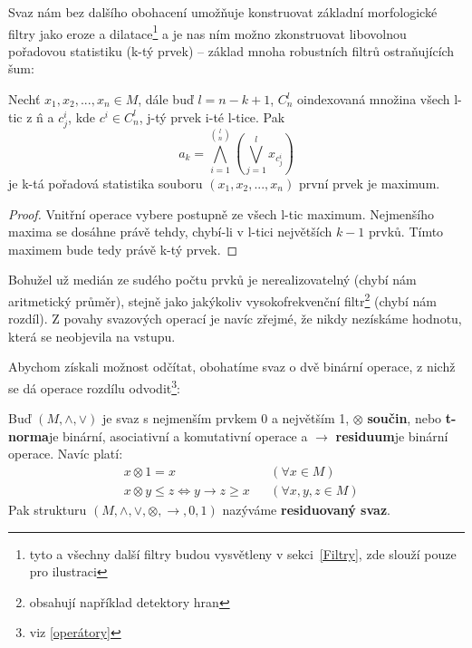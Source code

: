     Svaz nám bez dalšího obohacení umožňuje konstruovat základní morfologické filtry jako eroze a dilatace\footnote{tyto a všechny další filtry budou vysvětleny v sekci~\ref{Filtry}, zde slouží pouze pro ilustraci} a je nas ním možno zkonstruovat libovolnou pořadovou statistiku (k-tý prvek) -- základ mnoha robustních filtrů ostraňujících šum:

    \begin{theo}\label{k-tý prvek}
      Nechť $x_1,x_2,...,x_n \in M$, dále buď $l = n-k+1$, $C^{l}_n$ oindexovaná množina všech l-tic z \^n a $c^i_j$, kde $c^i \in C^{l}_n$, j-tý prvek i-té l-tice. Pak
      \[
        a_k = \bigwedge_{i = 1}^{{l}\choose{n}}\left( \bigvee_{j = 1}^{l} x_{c_{j}^i} \right)
      \]
      je k-tá pořadová statistika souboru $(x_1,x_2,...,x_n)$ \rl první prvek je maximum\rr.
    \end{theo}
    \begin{proof}
      Vnitřní operace vybere postupně ze všech l-tic maximum. Nejmenšího maxima se dosáhne právě tehdy, chybí-li v l-tici největších $k-1$ prvků. Tímto maximem bude tedy právě k-tý prvek. 
    \end{proof}
    
    Bohužel už medián ze sudého počtu prvků je nerealizovatelný (chybí nám aritmetický průměr), stejně jako jakýkoliv vysokofrekvenční filtr\footnote{obsahují například detektory hran} (chybí nám rozdíl). Z povahy svazových operací je navíc zřejmé, že nikdy nezískáme hodnotu, která se neobjevila na vstupu.
    
    Abychom získali možnost odčítat, obohatíme svaz o dvě binární operace, z nichž se dá operace rozdílu odvodit\footnote{viz \ref{operátory}}:
    
    \begin{define}\label{residuovaný svaz}
    Buď $(M,\wedge,\vee)$ je svaz s nejmenším prvkem 0 a největším 1, $\otimes$ \rl \textbf{součin}, nebo \textbf{t-norma}\rr je binární, asociativní a komutativní operace a $\rightarrow$ \rl \textbf{residuum}\rr je binární operace. Navíc platí:
    \begin{align}
    &x \otimes 1 = x  &&(\forall x \in M)\\
    &x \otimes y \leq z \Leftrightarrow y \rightarrow z \geq x &&(\forall x,y,z \in M)\label{Galoisova koresp}
    \end{align}
    Pak strukturu $(M,\wedge,\vee,\otimes,\rightarrow,0,1)$ nazýváme \textbf{residuovaný svaz}. 
    \end{define}
    
